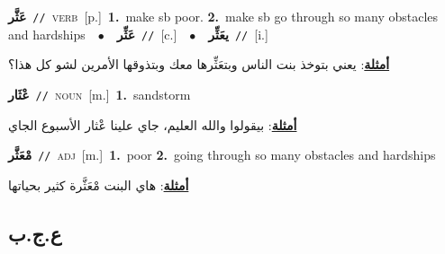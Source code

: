 \documentclass[10pt,a4paper,twoside]{article} %
\begin{document}
\begin{multicols}{2}
{\setlength\topsep{0pt}\textbf{\foreignlanguage{arabic}{عَثَّر}}\ {\color{gray}\texttt{//}\color{black}}\ \textsc{verb}\ [p.]\ \textbf{1.}~make sb poor.  \textbf{2.}~make sb go through so many obstacles and hardships\ \ $\bullet$\ \ \setlength\topsep{0pt}\textbf{\foreignlanguage{arabic}{عَثِّر}}\ {\color{gray}\texttt{//}\color{black}}\ [c.]\ \ $\bullet$\ \ \setlength\topsep{0pt}\textbf{\foreignlanguage{arabic}{يعَثِّر}}\ {\color{gray}\texttt{//}\color{black}}\ [i.]\  \begin{flushright}\color{gray}\foreignlanguage{arabic}{\textbf{\underline{\foreignlanguage{arabic}{أمثلة}}}: يعني بتوخذ بنت الناس وبتعَثِّرها معك وبتذوقها الأمرين لشو كل هذا؟}\end{flushright}\color{black}} \vspace{2mm}

{\setlength\topsep{0pt}\textbf{\foreignlanguage{arabic}{عْثَار}}\ {\color{gray}\texttt{//}\color{black}}\ \textsc{noun}\ [m.]\ \textbf{1.}~sandstorm\  \begin{flushright}\color{gray}\foreignlanguage{arabic}{\textbf{\underline{\foreignlanguage{arabic}{أمثلة}}}: بيقولوا والله العليم، جاي علينا عْثار الأسبوع الجاي}\end{flushright}\color{black}} \vspace{2mm}

{\setlength\topsep{0pt}\textbf{\foreignlanguage{arabic}{مْعَثَّر}}\ {\color{gray}\texttt{//}\color{black}}\ \textsc{adj}\ [m.]\ \textbf{1.}~poor  \textbf{2.}~going through so many obstacles and hardships\  \begin{flushright}\color{gray}\foreignlanguage{arabic}{\textbf{\underline{\foreignlanguage{arabic}{أمثلة}}}: هاي البنت مْعَثَّرة كثير بحياتها}\end{flushright}\color{black}} \vspace{2mm}

\vspace{-3mm}
\subsection*{\color{blue}\foreignlanguage{arabic}{ع.ج.ب}\color{blue}{}} 


\end{multicols}
\end{document}
